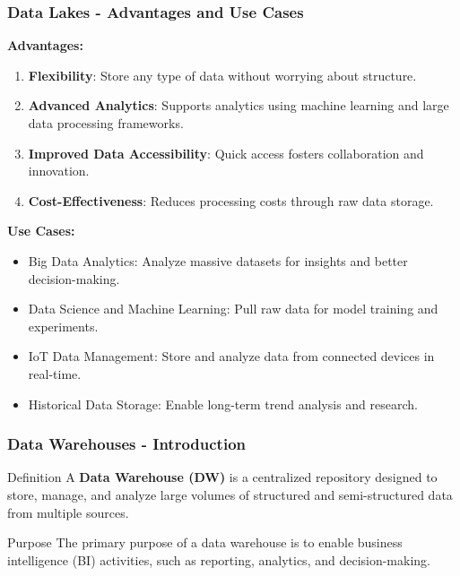 \documentclass[aspectratio=169]{beamer}
\begin{document}
\begin{frame}[fragile]
    \frametitle{Data Lakes - Advantages and Use Cases}
    \textbf{Advantages:}
    \begin{enumerate}
        \item \textbf{Flexibility}: Store any type of data without worrying about structure.
        \item \textbf{Advanced Analytics}: Supports analytics using machine learning and large data processing frameworks.
        \item \textbf{Improved Data Accessibility}: Quick access fosters collaboration and innovation.
        \item \textbf{Cost-Effectiveness}: Reduces processing costs through raw data storage.
    \end{enumerate}

    \textbf{Use Cases:}
    \begin{itemize}
        \item Big Data Analytics: Analyze massive datasets for insights and better decision-making.
        \item Data Science and Machine Learning: Pull raw data for model training and experiments.
        \item IoT Data Management: Store and analyze data from connected devices in real-time.
        \item Historical Data Storage: Enable long-term trend analysis and research.
    \end{itemize}
\end{frame}

\begin{frame}[fragile]
    \frametitle{Data Warehouses - Introduction}
    \begin{block}{Definition}
        A \textbf{Data Warehouse (DW)} is a centralized repository designed to store, manage, and analyze large volumes of structured and semi-structured data from multiple sources.
    \end{block}
    \begin{block}{Purpose}
        The primary purpose of a data warehouse is to enable business intelligence (BI) activities, such as reporting, analytics, and decision-making.
    \end{block}
\end{frame}
\end{document}
